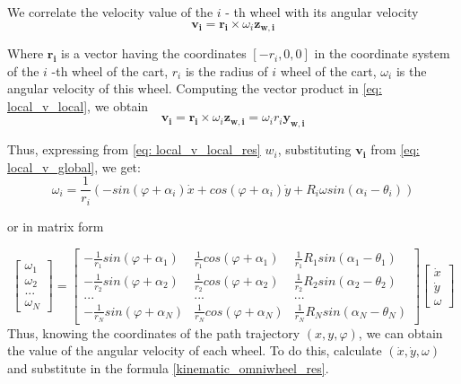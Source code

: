 \documentclass[oneside,final,14pt]{extreport}
\newcommand{\bs}{\boldsymbol}
\begin{document}
We correlate the velocity value of the $ i $ - th wheel with its angular velocity
\begin{equation}
\label{eq: local_v_local}
\bs{v_{i}}
=
\bs{r_{i}}
\times
\omega_{i}
\bs{z_{w, i}}
\end{equation}

Where $ \bs{r_{i}} $ is a vector having the coordinates $ [- r_{i}, 0,0] $ in the coordinate system of the $ i $ -th wheel of the cart, $ r_{i} $ is the radius of $ i $ wheel of the cart, $ \omega_{i} $ is the angular velocity of this wheel.
Computing the vector product in \ref{eq: local_v_local}, we obtain
\begin{equation}
\label{eq: local_v_local_res}
\bs{v_{i}}
=
\bs{r_{i}}
\times
\omega_{i}
\bs{z_{w, i}}
=
\omega_{i}
r_{i}
\bs{y_{w, i}}
\end{equation}

Thus, expressing from \ref{eq: local_v_local_res} $ w_{i} $, substituting $ \bs{v_{i}} $ from \ref{eq: local_v_global}, we get:
\begin{equation}
\omega_{i}
=
\frac{1}{r_{i}}
(
-sin (\varphi + \alpha_{i}) \dot{x}
+ cos (\varphi + \alpha_{i}) \dot{y}
+
R_{i}
\omega
sin (\alpha_{i} - \theta_{i})
)
\end{equation}

or in matrix form

\begin{equation}
\label{kinematic_omniwheel_res}
\begin{bmatrix}
\omega_{1} \\
\omega_{2} \\
... \\
\omega_{N}
\end{bmatrix}
=
\begin{bmatrix}
- \frac{1}{r_{1}} sin (\varphi + \alpha_{1}) &
\frac{1}{r_{1}} cos (\varphi + \alpha_{1}) &
\frac{1}{r_{1}} R_{1} sin (\alpha_{1} - \theta_{1})
\\
- \frac{1}{r_{2}} sin (\varphi + \alpha_{2}) &
\frac{1}{r_{2}} cos (\varphi + \alpha_{2}) &
\frac{1}{r_{2}} R_{2} sin (\alpha_{2} - \theta_{2})
\\
... & ... & ...
\\
- \frac{1}{r_{N}} sin (\varphi + \alpha_{N}) &
\frac{1}{r_{N}} cos (\varphi + \alpha_{N}) &
\frac{1}{r_{N}} R_{N} sin (\alpha_{N} - \theta_{N})
\end{bmatrix}
\begin{bmatrix}
\dot{x} \\
\dot{y} \\
\omega
\end{bmatrix}
\end{equation}
Thus, knowing the coordinates of the path trajectory $ (x, y, \varphi) $, we can obtain the value of the angular velocity of each wheel. To do this, calculate $ (\dot{x}, \dot{y}, \omega) $ and substitute in the formula \ref{kinematic_omniwheel_res}.
\end{document}
